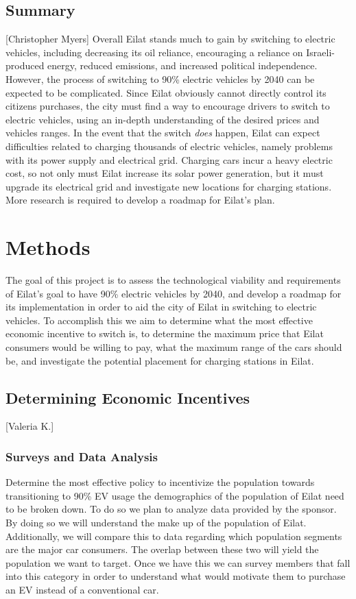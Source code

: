 \documentclass[12pt]{article}                         %
\begin{document}
\subsection{Summary}[Christopher Myers]
Overall Eilat stands much to gain by switching to electric vehicles, including decreasing its oil reliance, encouraging a reliance on Israeli-produced energy, reduced emissions, and increased political independence. However, the process of switching to 90\% electric vehicles by 2040 can be expected to be complicated. Since Eilat obviously cannot directly control its citizens purchases, the city must find a way to encourage drivers to switch to electric vehicles, using an in-depth understanding of the desired prices and vehicles ranges. In the event that the switch \textit{does} happen, Eilat can expect difficulties related to charging thousands of electric vehicles, namely problems with its power supply and electrical grid. Charging cars incur a heavy electric cost, so not only must Eilat increase its solar power generation, but it must upgrade its electrical grid and investigate new locations for charging stations. More research is required to develop a roadmap for Eilat's plan.

\newpage
\section{Methods}
The goal of this project is to assess the technological viability and requirements of Eilat's goal to have 90\% electric vehicles by 2040, and develop a roadmap for its implementation in order to aid the city of Eilat in switching to electric vehicles. To accomplish this we aim to determine what the most effective economic incentive to switch is, to determine the maximum price that Eilat consumers would be willing to pay, what the maximum range of the cars should be, and investigate the potential placement for charging stations in Eilat.


\subsection{Determining Economic Incentives}[Valeria K.]
\subsubsection{Surveys and Data Analysis}
Determine the most effective policy to incentivize the population towards transitioning to 90\% EV usage the demographics of the population of Eilat need to be broken down. To do so we plan to analyze data provided by the sponsor. By doing so we will understand the make up of the population of Eilat. Additionally, we will compare this to data regarding which population segments are the major car consumers. The overlap between these two will yield the population we want to target. Once we have this we can survey members that fall into this category in order to understand what would motivate them to purchase an EV instead of a conventional car.
\end{document}
